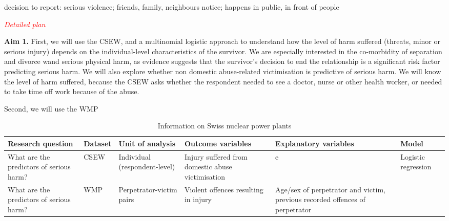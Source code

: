 \documentclass[11pt, a4paper]{article}
\begin{document}
decision to report: serious violence; friends, family, neighbours notice; happens in public, in front of people  

\textcolor{red}{\textit{Detailed plan}}


\textbf{Aim 1.} First, we will use the CSEW, and a multinomial logistic approach to understand how the level of harm suffered (threats, minor or serious injury) depends on the individual-level characteristics of the survivor. We are especially interested in the co-morbidity of separation and divorce wand serious physical harm, as evidence suggests that the survivor's decision to end the relationship is a significant risk factor predicting serious harm. We will also explore whether non domestic abuse-related victimisation is predictive of serious harm. We will know the level of harm suffered, because the CSEW asks whether the respondent needed to see a doctor, nurse or other health worker, or needed to take time off work because of the abuse. 


Second, we will use the WMP 

\begin{table}[!htbp]
\caption{Information on Swiss nuclear power plants}
  \begin{threeparttable}[t]
  \centering
       \begin{tabular}{ L{2.8cm}  C{1.8cm}  C{1.8cm}  C{3.2cm}  C{2.8cm}  C{2cm} }
    \toprule
     \textbf{Research question} & \textbf{Dataset}    & \textbf{Unit of analysis} & \textbf{Outcome variables} & \textbf{Explanatory variables} & \textbf{Model} \\
    \midrule
    What are the predictors of serious harm? & CSEW & Individual (respondent-level) & Injury suffered from domestic abuse victimisation & e & Logistic regression \\
    What are the predictors of serious harm? & WMP & Perpetrator-victim pairs & Violent offences resulting in injury & Age/sex of perpetrator and victim, previous recorded offences of perpetrator &  \\
     \bottomrule
  \end{tabular}
    \end{threeparttable}%
  \label{tab:addlabel}%
\end{table}%
\end{document}
